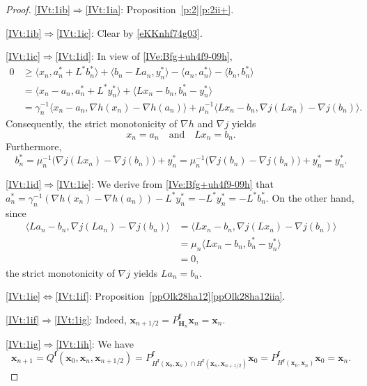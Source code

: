 \documentclass[a4paper,11pt,fleqn]{article}
\renewcommand{\geq}{\ensuremath{\geqslant}}
\newcommand{\pair}[2]{\langle{{#1},{#2}}\rangle}
\theoremstyle{plain}{\theorembodyfont{\rmfamily}%
\newtheorem{conjecture}[theorem]{Conjecture}}
\theoremstyle{plain}{\theorembodyfont{\rmfamily}%
\newtheorem{example}[theorem]{Example}}
\theoremstyle{plain}{\theorembodyfont{\rmfamily}%
\newtheorem{remark}[theorem]{Remark}}
\theoremstyle{plain}{\theorembodyfont{\rmfamily}%
\newtheorem{algorithm}[theorem]{Algorithm}}
\theoremstyle{plain}{\theorembodyfont{\rmfamily}%
\newtheorem{condition}[theorem]{Condition}}
\theoremstyle{plain}{\theorembodyfont{\rmfamily}%
\newtheorem{definition}[theorem]{Definition}}
\theoremstyle{plain}{\theorembodyfont{\rmfamily}
\newtheorem{problem}[theorem]{Problem}}
\theoremstyle{plain}{\theorembodyfont{\rmfamily}
\newtheorem{notation}[theorem]{Notation}}
\numberwithin{equation}{section}
\begin{document}
\begin{proof}
\ref{IVt:1ib}$\Rightarrow$\ref{IVt:1ia}: 
Proposition~\ref{p:2}\ref{p:2ii+}.

\ref{IVt:1ib}$\Rightarrow$\ref{IVt:1ic}: Clear by
\eqref{eKKnhf74g03}.

\ref{IVt:1ic}$\Rightarrow$\ref{IVt:1id}: In view of 
\eqref{IVe:Bfg+uh4f9-09h},
\begin{align}
0
&\geq\pair{x_n}{a_n^*+L^*b_n^*}
+\pair{b_n-La_n}{y_n^*}-\pair{a_n}{a_n^*}-\pair{b_n}{b_n^*}
\nonumber\\
&=\pair{x_n-a_n}{a_n^*+L^*y_n^*}+\pair{Lx_n-b_n}{b_n^*-y_n^*}
\nonumber\\
&=\gamma_n^{-1}\pair{x_n-a_n}{\nabla h(x_n)-\nabla h(a_n)}
+\mu_n^{-1}\pair{Lx_n-b_n}{\nabla j(Lx_n)-\nabla j(b_n)}.
\end{align}
Consequently, the strict monotonicity of $\nabla h$ and $\nabla j$ 
yields
\begin{equation}
x_n=a_n\quad\text{and}\quad Lx_n=b_n.
\end{equation}
Furthermore,
\begin{equation}
b_n^*=\mu_n^{-1}\big(\nabla j(Lx_n)-\nabla j(b_n)\big)+y_n^*
=\mu_n^{-1}\big(\nabla j(b_n)-\nabla j(b_n)\big)+y_n^*
=y_n^*.
\end{equation}

\ref{IVt:1id}$\Rightarrow$\ref{IVt:1ie}: We derive from 
\eqref{IVe:Bfg+uh4f9-09h} that
$a_n^*=\gamma_n^{-1}(\nabla h(x_n)-\nabla h(a_n))-L^*y_n^*
=-L^*y_n^*=-L^*b_n^*$. On the other hand, since
\begin{align}
\label{IWeQA8h33-30a}
\pair{La_n-b_n}{\nabla j(La_n)-\nabla j(b_n)}
&=\pair{Lx_n-b_n}{\nabla j(Lx_n)-\nabla j(b_n)}\nonumber\\
&=\mu_n\pair{Lx_n-b_n}{b_n^*-y_n^*}\nonumber\\
&=0,
\end{align}
the strict monotonicity of $\nabla j$ yields $La_n=b_n$.

\ref{IVt:1ie}$\Leftrightarrow$\ref{IVt:1if}: 
Proposition~\ref{ppOlk28ha12}\ref{ppOlk28ha12iia}.

\ref{IVt:1if}$\Rightarrow$\ref{IVt:1ig}: Indeed,
$\boldsymbol{x}_{n+1/2}=P_{\boldsymbol{H}_n}^{\boldsymbol{f}}
\boldsymbol{x}_n=\boldsymbol{x}_n$.

\ref{IVt:1ig}$\Rightarrow$\ref{IVt:1ih}: We have
\begin{equation}
\label{IWeQA8h33-30b}
\boldsymbol{x}_{n+1}=Q^{\boldsymbol{f}}(\boldsymbol{x}_0,
\boldsymbol{x}_n,\boldsymbol{x}_{n+1/2})=
P^{\boldsymbol{f}}_{H^{\boldsymbol{f}}
(\boldsymbol{x}_0,\boldsymbol{x}_n)\cap H^{\boldsymbol{f}}
(\boldsymbol{x}_n,\boldsymbol{x}_{n+1/2})}
\boldsymbol{x}_0=P^{\boldsymbol{f}}_{H^{\boldsymbol{f}}
(\boldsymbol{x}_0,\boldsymbol{x}_n)}\boldsymbol{x}_0
=\boldsymbol{x}_n.
\end{equation}


\end{proof}
\end{document}
